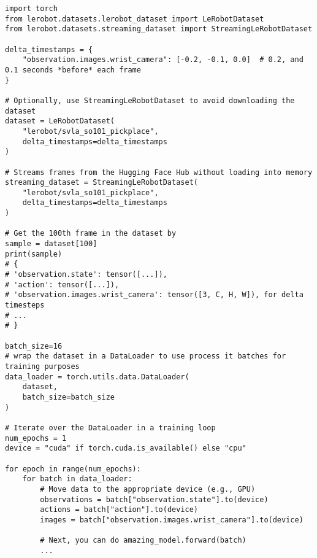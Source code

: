 \begin{verbatim}
import torch
from lerobot.datasets.lerobot_dataset import LeRobotDataset
from lerobot.datasets.streaming_dataset import StreamingLeRobotDataset

delta_timestamps = {
    "observation.images.wrist_camera": [-0.2, -0.1, 0.0]  # 0.2, and 0.1 seconds *before* each frame
}

# Optionally, use StreamingLeRobotDataset to avoid downloading the dataset
dataset = LeRobotDataset(
    "lerobot/svla_so101_pickplace",
    delta_timestamps=delta_timestamps
)

# Streams frames from the Hugging Face Hub without loading into memory
streaming_dataset = StreamingLeRobotDataset(
    "lerobot/svla_so101_pickplace",
    delta_timestamps=delta_timestamps
)

# Get the 100th frame in the dataset by 
sample = dataset[100]
print(sample)
# {
# 'observation.state': tensor([...]), 
# 'action': tensor([...]), 
# 'observation.images.wrist_camera': tensor([3, C, H, W]), for delta timesteps
# ...
# }

batch_size=16
# wrap the dataset in a DataLoader to use process it batches for training purposes
data_loader = torch.utils.data.DataLoader(
    dataset,
    batch_size=batch_size
)

# Iterate over the DataLoader in a training loop
num_epochs = 1
device = "cuda" if torch.cuda.is_available() else "cpu"

for epoch in range(num_epochs):
    for batch in data_loader:
        # Move data to the appropriate device (e.g., GPU)
        observations = batch["observation.state"].to(device)
        actions = batch["action"].to(device)
        images = batch["observation.images.wrist_camera"].to(device)

        # Next, you can do amazing_model.forward(batch)
        ...
\end{verbatim}